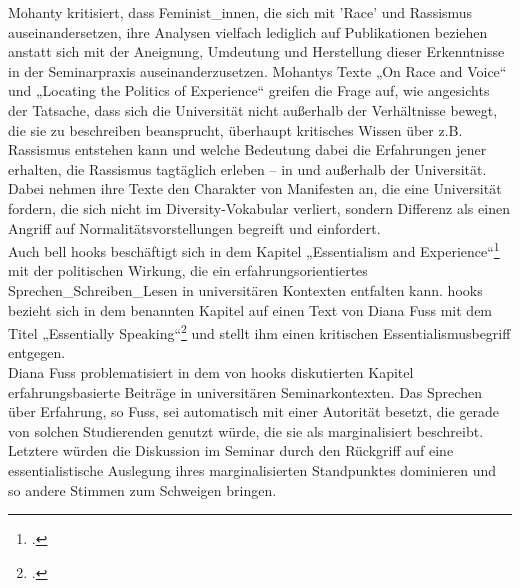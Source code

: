 Mohanty kritisiert, dass Feminist\_innen, die sich mit 'Race' und Rassismus
auseinandersetzen, ihre Analysen vielfach lediglich auf Publikationen beziehen
anstatt sich mit der Aneignung, Umdeutung und Herstellung dieser Erkenntnisse
in der Seminarpraxis auseinanderzusetzen. Mohantys Texte „On Race and
Voice“\footnotemark {} und
„Locating the Politics of Experience“\footnotemark{} greifen
die Frage auf, wie angesichts der Tatsache, dass sich die Universität nicht
außerhalb der Verhältnisse bewegt, die sie zu beschreiben beansprucht,
überhaupt kritisches Wissen über z.B. Rassismus entstehen kann und welche
Bedeutung dabei die Erfahrungen jener erhalten, die Rassismus tagtäglich
erleben – in und außerhalb der Universität. Dabei nehmen ihre Texte den
Charakter von Manifesten an, die eine Universität fordern, die sich nicht im
Diversity-Vokabular verliert, sondern Differenz als einen Angriff auf
Normalitätsvorstellungen begreift und einfordert.\\

Auch bell hooks beschäftigt sich in dem Kapitel „Essentialism and
Experience“\footnotemark\footcitetext{bellhooks}
mit der politischen Wirkung, die ein erfahrungsorientiertes
Sprechen\_Schreiben\_Lesen in universitären Kontexten entfalten kann. hooks
bezieht sich in dem benannten Kapitel auf einen Text von Diana Fuss mit dem
Titel „Essentially Speaking“\footnotemark\footcitetext[77]{bellhooks} und stellt ihm einen kritischen
Essentialismusbegriff entgegen.\\

Diana Fuss problematisiert in dem von hooks diskutierten Kapitel
erfahrungsbasierte Beiträge in universitären Seminarkontexten. Das Sprechen
über Erfahrung, so Fuss, sei automatisch mit einer Autorität besetzt, die
gerade von solchen Studierenden genutzt würde, die sie als marginalisiert
beschreibt. Letztere würden die Diskussion im Seminar durch den Rückgriff auf
eine essentialistische Auslegung ihres marginalisierten Standpunktes dominieren
und so andere Stimmen zum Schweigen bringen.\footnotemark{}\\

